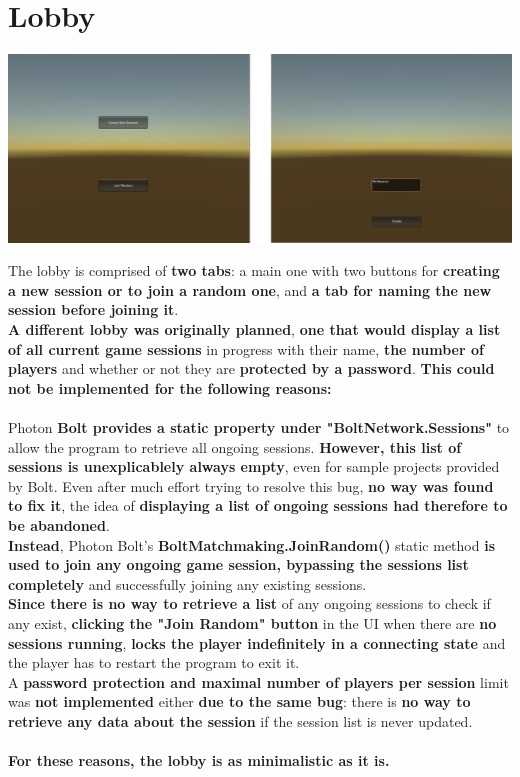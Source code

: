 \documentclass[12pt,a4paper]{article}
\begin{document}
\section{Lobby}
\begin{center}
\includegraphics[scale=0.4]{lobby}
\end{center}
The lobby is comprised of \textbf{two tabs}: a main one with two buttons for \textbf{creating a new session or to join a random one}, and \textbf{a tab for naming the new session before joining it}.\\
\textbf{A different lobby was originally planned}, \textbf{one that would display a list of all current game sessions} in progress with their name, \textbf{the number of players} and whether or not they are \textbf{protected by a password}. \textbf{This could not be implemented for the following reasons:}\\\\
Photon \textbf{Bolt provides a static property under "BoltNetwork.Sessions"} to allow the program to retrieve all ongoing sessions. \textbf{However, this list of sessions is unexplicablely always empty}, even for sample projects provided by Bolt. Even after much effort trying to resolve this bug, \textbf{no way was found to fix it}, the idea of \textbf{displaying a list of ongoing sessions had therefore to be abandoned}.\\
\textbf{Instead}, Photon Bolt's \textbf{BoltMatchmaking.JoinRandom()} static method \textbf{is used to join any ongoing game session, bypassing the sessions list completely} and successfully joining any existing sessions.\\
\textbf{Since there is no way to retrieve a list} of any ongoing sessions to check if any exist, \textbf{clicking the "Join Random" button} in the UI when there are \textbf{no sessions running}, \textbf{locks the player indefinitely in a connecting state} and the player has to restart the program to exit it.\\
A\textbf{ password protection and maximal number of players per session} limit was \textbf{not implemented} either \textbf{due to the same bug}: there is \textbf{no way to retrieve any data about the session} if the session list is never updated.\\\\
\textbf{For these reasons, the lobby is as minimalistic as it is.}
\end{document}
